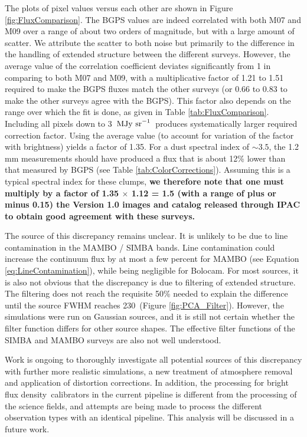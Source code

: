 \documentclass[12pt,preprint]{aastex}
\newcommand{\flux}{flux density}
\newcommand\mjysr{\ensuremath{{\rm MJy~sr}^{-1}}}
\begin{document}
The plots of pixel values versus each other are shown in Figure
\ref{fig:FluxComparison}.  The BGPS values are indeed correlated with
both M07 and M09 over a range of about two orders of magnitude, but
with a large amount of scatter.  We attribute the scatter to both
noise but primarily to the difference in the handling of extended
structure between the different surveys.  However, the average value
of the correlation coefficient deviates significantly from 1 in
comparing to both M07 and M09, with a multiplicative factor of 1.21 to
1.51 required to make the BGPS fluxes match the other surveys (or 0.66
to 0.83 to make the other surveys agree with the BGPS).  This factor
also depends on the range over which the fit is done, as given in
Table \ref{tab:FluxComparison}.  Including all pixels down to
3~\mjysr\ produces systematically larger required correction factor.
Using the average value (to account for variation of the factor with
brightness) yields a factor of 1.35.  For a dust spectral index of
$\sim3.5$, the 1.2 mm measurements should have produced a flux that is
about 12\% lower than that measured by BGPS (see Table
\ref{tab:ColorCorrections}).  Assuming this is a typical spectral
index for these clumps, {\bf we therefore note that one must multiply
by a factor of 1.35 $\times$ 1.12 = 1.5 (with a range of plus or minus
0.15) the Version 1.0 images and catalog released through IPAC to
obtain good agreement with these surveys.}

The source of this discrepancy remains unclear.  It is unlikely to be
due to line contamination in the MAMBO / SIMBA bands.  Line
contamination could increase the continuum flux by at most a few
percent for MAMBO (see Equation \ref{eq:LineContamination}), while
being negligible for Bolocam.  For most sources, it is also not
obvious that the discrepancy is due to filtering of extended
structure.  The filtering does not reach the requisite 50\% needed to
explain the difference until the source FWHM reaches 230\arcsec\
(Figure \ref{fig:PCA_Filter}).  However, the simulations were run on
Gaussian sources, and it is still not certain whether the filter
function differs for other source shapes.  The effective filter
functions of the SIMBA and MAMBO surveys are also not well understood.

Work is ongoing to thoroughly investigate all potential sources of
this discrepancy with further more realistic simulations, a new
treatment of atmosphere removal and application of distortion
corrections.  In addition, the processing for bright \flux\
calibrators in the current pipeline is different from the processing
of the science fields, and attempts are being made to process the
different observation types with an identical pipeline.  This analysis
will be discussed in a future work.
\end{document}
